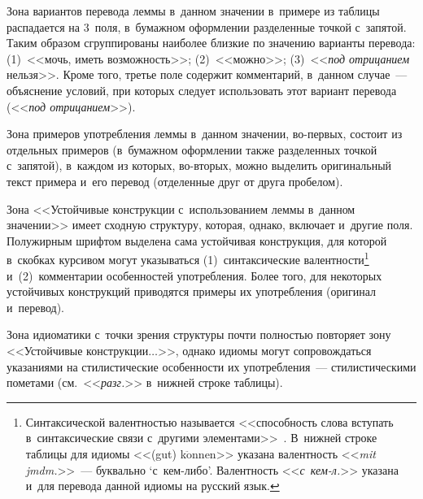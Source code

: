 \begin{multicols}{2}
  Зона вариантов перевода леммы в~данном значении в~примере из таблицы 
распадается на 3~поля, в~бумажном оформлении разделенные точкой 
с~запятой. Таким образом сгруппированы наиболее близкие по значению 
варианты перевода: (1)~<<мочь, иметь возможность>>; (2)~<<можно>>; 
(3)~<<\textit{под отрицанием} нельзя>>. Кроме того, третье поле содержит 
комментарий, в~данном случае~--- объяснение условий, при которых следует 
использовать этот вариант перевода (<<\textit{под отрицанием}>>).
  
  Зона примеров употребления леммы в~данном значении, во-пер\-вых, 
состоит из отдельных примеров (в~бумажном оформлении также 
разделенных точкой с~запятой), в~каждом из которых, во-вторых, можно 
выделить оригинальный текст примера и~его перевод (отделенные друг от 
друга пробелом).
  
  Зона <<Устойчивые конструкции с~использованием леммы в~данном 
значении>> имеет сходную структуру, которая, однако, включает и~другие 
поля. Полужирным шрифтом выделена сама устойчивая конструкция, для 
которой в~скобках курсивом могут указываться (1)~синтаксические 
валентности\footnote{Синтаксической валентностью называется <<способность слова 
вступать в~синтаксические связи с~другими элементами>>~\cite[с.~79--80]{12-gz}. В~нижней 
строке таблицы для идиомы <<(gut) k$\ddot{\mbox{o}}$nnen>> указана валентность <<\textit{mit 
jmdm.}>>~--- буквально `с~кем-ли\-бо'. Валентность <<\textit{с~кем-л.}>> указана и~для перевода 
данной идиомы на русский язык.} и~(2)~комментарии особенностей употребления. 
Более того, для некоторых устойчивых конструкций приводятся примеры их 
употребления (оригинал и~перевод).
  
  Зона идиоматики с~точки зрения структуры почти полностью повторяет 
зону <<Устойчивые конструкции$\ldots$>>, однако идиомы могут 
со\-про\-вож\-дать\-ся указаниями на стилистические особенности их 
употребления~--- стилистическими пометами (см.\ <<\textit{разг.}>> 
в~нижней строке таблицы).
  

\end{multicols}
